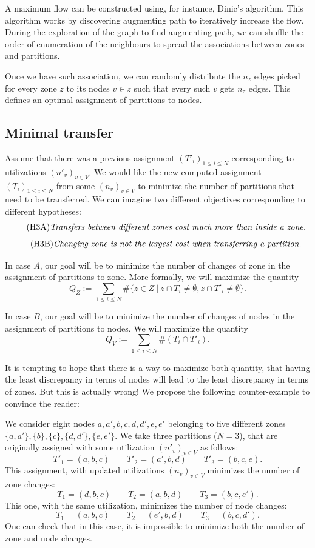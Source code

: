 \documentclass[]{article}
\begin{document}
A maximum flow can be constructed using, for instance, Dinic's algorithm. This algorithm works by discovering augmenting path to iteratively increase the flow. During the exploration of the graph to find augmenting path, we can shuffle the order of enumeration of the neighbours to spread the associations between zones and partitions.

Once we have such association, we can randomly distribute the $n_z$ edges picked for every zone $z$ to its nodes $v\in z$ such that every such $v$ gets $n_z$ edges. This defines an optimal assignment of partitions to nodes.


\subsection{Minimal transfer}

Assume that there was a previous assignment $(T'_i)_{1\le i\le N}$ corresponding to utilizations $(n'_v)_{v\in V}$. We would like the new computed assignment $(T_i)_{1\le i\le N}$ from some $(n_v)_{v\in V}$ to minimize the number of partitions that need to be transferred. We can imagine two different objectives corresponding to different hypotheses: 
\begin{equation}
	\tag{H3A}
	\label{hyp:A}
	\text{\emph{Transfers between different zones cost much more than inside a zone.}}
\end{equation}
\begin{equation}
	\tag{H3B}
	\label{hyp:B}
	\text{\emph{Changing zone is not the largest cost when transferring a partition.}}
\end{equation}

In case $A$, our goal will be to minimize the number of changes of zone in the assignment of partitions to zone. More formally, we will maximize the quantity
$$
Q_Z := 
\sum_{1\le i\le N} 
\#\{z\in Z ~|~ z\cap T_i \neq \emptyset, z\cap T'_i \neq \emptyset \}
.$$

In case $B$, our goal will be to minimize the number of changes of nodes in the assignment of partitions to nodes. We will maximize the quantity
$$
Q_V :=
\sum_{1\le i\le N} \#(T_i \cap T'_i).
$$

It is tempting to hope that there is a way to maximize both quantity, that having the least discrepancy in terms of nodes will lead to the least discrepancy in terms of zones. But this is actually wrong! We propose the following counter-example to convince the reader:

We consider eight nodes $a, a', b, c, d, d', e, e'$ belonging to five different zones $\{a,a'\}, \{b\}, \{c\}, \{d,d'\}, \{e, e'\}$. We take three partitions ($N=3$), that are originally assigned with some utilization $(n'_v)_{v\in V}$ as follows:
$$
T'_1=(a,b,c) \qquad
T'_2=(a',b,d) \qquad 
T'_3=(b,c,e).
$$
This assignment, with updated utilizations $(n_v)_{v\in V}$ minimizes the number of zone changes:
$$
T_1=(d,b,c) \qquad
T_2=(a,b,d) \qquad 
T_3=(b,c,e').
$$
This one, with the same utilization, minimizes the number of node changes:
$$
T_1=(a,b,c) \qquad
T_2=(e',b,d) \qquad 
T_3=(b,c,d').
$$
One can check that in this case, it is impossible to minimize both the number of zone and node changes.
\end{document}
